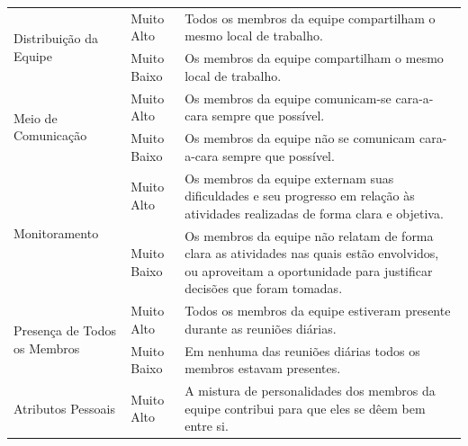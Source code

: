 \begin{center}
\begin{longtable}{
|p{0.30\dimexpr \textwidth-3\arrayrulewidth-3\tabcolsep\relax}|
 p{0.08\dimexpr \textwidth-3\arrayrulewidth-3\tabcolsep\relax}|
 p{0.62\dimexpr \textwidth-3\arrayrulewidth-3\tabcolsep\relax}|
}
\multirow{2}{*}{Distribuição da Equipe}       & Muito Alto  & Todos os membros da equipe compartilham o mesmo local de trabalho.                                                                                                                    \\ \cline{2-3}
                                              & Muito Baixo & Os membros da equipe compartilham o mesmo local de trabalho.                                                                                                                          \\ \hline
\multirow{2}{*}{Meio de Comunicação}          & Muito Alto  & Os membros da equipe comunicam-se cara-a-cara sempre que possível.                                                                                                                    \\ \cline{2-3}
                                              & Muito Baixo & Os membros da equipe não se comunicam cara-a-cara sempre que possível.                                                                                                                \\ \hline
\multirow{2}{*}{Monitoramento}                & Muito Alto  & Os membros da equipe externam suas dificuldades e seu progresso em relação às atividades realizadas de forma clara e objetiva.                                                        \\ \cline{2-3}
                                              & Muito Baixo & Os membros da equipe não relatam de forma clara as atividades nas quais estão envolvidos, ou aproveitam a oportunidade para justificar decisões que foram tomadas.                    \\ \hline
\multirow{2}{*}{Presença de Todos os Membros} & Muito Alto  & Todos os membros da equipe estiveram presente durante as reuniões diárias.                                                                                                            \\ \cline{2-3}
                                              & Muito Baixo & Em nenhuma das reuniões diárias todos os membros estavam presentes.                                                                                                                   \\ \hline
\multirow{2}{*}{Atributos Pessoais}           & Muito Alto  & A mistura de personalidades dos membros da equipe contribui para que eles se dêem bem entre si.                                                                                       \\ \cline{2-3}

\end{longtable}
\end{center}
